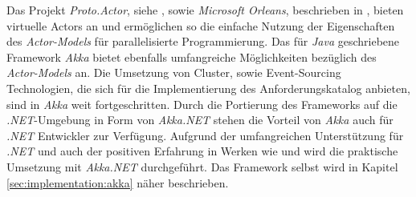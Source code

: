 Das Projekt \textit{Proto.Actor}, siehe \cite{Proto.Actor}, sowie \textit{Microsoft Orleans}, beschrieben in \cite{bykov2011orleans}, bieten virtuelle Actors an und ermöglichen so die einfache Nutzung der Eigenschaften des \textit{Actor-Models} für parallelisierte Programmierung. Das für \textit{Java} geschriebene Framework \textit{Akka} bietet ebenfalls umfangreiche Möglichkeiten bezüglich des \textit{Actor-Models} an. Die Umsetzung von Cluster, sowie Event-Sourcing Technologien, die sich für die Implementierung des Anforderungskatalog anbieten, sind in \textit{Akka} weit fortgeschritten. Durch die Portierung des Frameworks auf die \textit{.NET}-Umgebung in Form von \textit{Akka.NET} stehen die Vorteil von \textit{Akka} auch für \textit{.NET} Entwickler zur Verfügung.
Aufgrund der umfangreichen Unterstützung für \textit{.NET} und auch der positiven Erfahrung in Werken wie \cite{Vernon2015ReactiveAkka} und \cite{bernhardt2016reactive} wird die praktische Umsetzung mit \textit{Akka.NET} durchgeführt.
 Das Framework selbst wird in Kapitel \ref{sec:implementation:akka} näher beschrieben. 